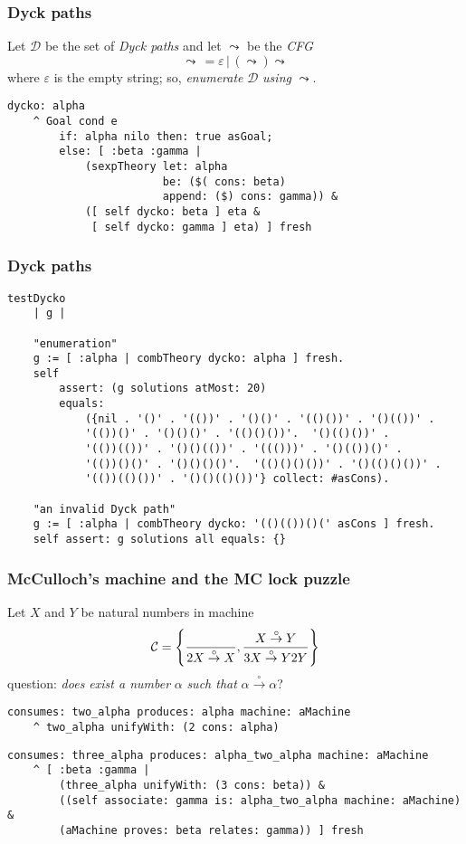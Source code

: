 \documentclass{beamer}
\begin{document}
\begin{frame}[fragile]
\frametitle{Dyck paths}
Let $\mathcal{D}$ be the set of \textit{Dyck paths} and let $\leadsto$ be the \textit{CFG}
$$
\leadsto \,= \varepsilon \,\left|\, ( \leadsto ) \leadsto \right.
$$
where $\varepsilon$ is the empty string; so, \textit{enumerate} $\mathcal{D}$
\textit{using} $\leadsto$.
\begin{verbatim}
dycko: alpha
    ^ Goal cond e
        if: alpha nilo then: true asGoal;
        else: [ :beta :gamma |
            (sexpTheory let: alpha
                        be: ($( cons: beta)
                        append: ($) cons: gamma)) &
            ([ self dycko: beta ] eta &
             [ self dycko: gamma ] eta) ] fresh
\end{verbatim}
\end{frame}

\begin{frame}[fragile]
\frametitle{Dyck paths}
\begin{verbatim}
testDycko
    | g |

    "enumeration"
    g := [ :alpha | combTheory dycko: alpha ] fresh.
    self
        assert: (g solutions atMost: 20)
        equals:
            ({nil . '()' . '(())' . '()()' . '(()())' . '()(())' .
            '(())()' . '()()()' . '(()()())'.  '()(()())' .
            '(())(())' . '()()(())' . '((()))' . '()(())()' .
            '(())()()' . '()()()()'.  '(()()()())' . '()(()()())' .
            '(())(()())' . '()()(()())'} collect: #asCons).

    "an invalid Dyck path"
    g := [ :alpha | combTheory dycko: '(()(())()(' asCons ] fresh.
    self assert: g solutions all equals: {}
\end{verbatim}
\end{frame}

\begin{frame}[fragile]
\frametitle{McCulloch's machine and the MC lock puzzle}
Let $X$ and $Y$ be natural numbers in machine
\begin{displaymath}
\mathcal{C} =  \left \lbrace{ \over 2X \stackrel{\circ}{\rightarrow} X} , {X \stackrel{\circ}{\rightarrow} Y \over 3X \stackrel{\circ}{\rightarrow} Y 2 Y} \right \rbrace
\end{displaymath}
question: \textit{does exist a number} $\alpha$ \textit{such that} $ \alpha \stackrel{\circ}{\rightarrow} \alpha $?
\begin{verbatim}
consumes: two_alpha produces: alpha machine: aMachine
    ^ two_alpha unifyWith: (2 cons: alpha)
\end{verbatim}
\begin{verbatim}
consumes: three_alpha produces: alpha_two_alpha machine: aMachine
    ^ [ :beta :gamma |
        (three_alpha unifyWith: (3 cons: beta)) &
        ((self associate: gamma is: alpha_two_alpha machine: aMachine) &
        (aMachine proves: beta relates: gamma)) ] fresh
\end{verbatim}
\end{frame}
\end{document}
